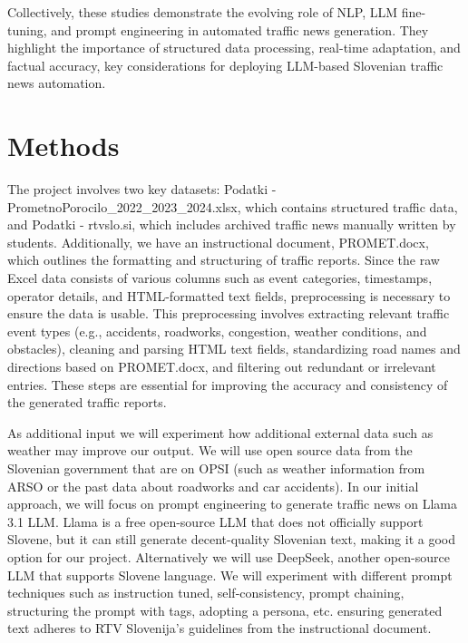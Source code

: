 \documentclass[fleqn,moreauthors,10pt]{ds_report}
\begin{document}
Collectively, these studies demonstrate the evolving role of NLP, LLM fine-tuning, and prompt engineering in automated traffic news generation. They highlight the importance of structured data processing, real-time adaptation, and factual accuracy, key considerations for deploying LLM-based Slovenian traffic news automation.


\section*{Methods}
The project involves two key datasets: Podatki - PrometnoPorocilo\_2022\_2023\_2024.xlsx, which contains structured traffic data, and Podatki - rtvslo.si, which includes archived traffic news manually written by students. Additionally, we have an instructional document, PROMET.docx, which outlines the formatting and structuring of traffic reports. Since the raw Excel data consists of various columns such as event categories, timestamps, operator details, and HTML-formatted text fields, preprocessing is necessary to ensure the data is usable. This preprocessing involves extracting relevant traffic event types (e.g., accidents, roadworks, congestion, weather conditions, and obstacles), cleaning and parsing HTML text fields, standardizing road names and directions based on PROMET.docx, and filtering out redundant or irrelevant entries. These steps are essential for improving the accuracy and consistency of the generated traffic reports.

As additional input we will experiment how additional external data such as weather may improve our output. We will use open source data from the Slovenian government that are on OPSI (such as weather information from ARSO or the past data about roadworks and car accidents).
In our initial approach, we will focus on prompt engineering to generate traffic news on Llama 3.1 LLM. Llama is a free open-source LLM that does not officially support Slovene, but it can still generate decent-quality Slovenian text, making it a good option for our project. Alternatively we will use DeepSeek, another open-source LLM that supports Slovene language. We will experiment with different prompt techniques such as instruction tuned, self-consistency, prompt chaining, structuring the prompt with tags, adopting a persona, etc. ensuring generated text adheres to RTV Slovenija’s guidelines from the instructional document. 
\end{document}
